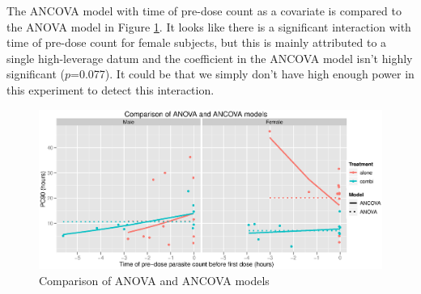 The ANCOVA model with time of pre-dose count as a covariate is compared to the ANOVA model in Figure \ref{compancova2}. It looks like there is a significant interaction with time of pre-dose count for female subjects, but this is mainly attributed to a single high-leverage datum and the coefficient in the ANCOVA model isn't highly significant ($p$=0.077). It could be that we simply don't have high enough power in this experiment to detect this interaction.
\begin{figure}[ht]
\includegraphics[width=6.5in]{compancova2.eps} 
\caption{Comparison of ANOVA and ANCOVA models}
\label{compancova2}
\end{figure}
